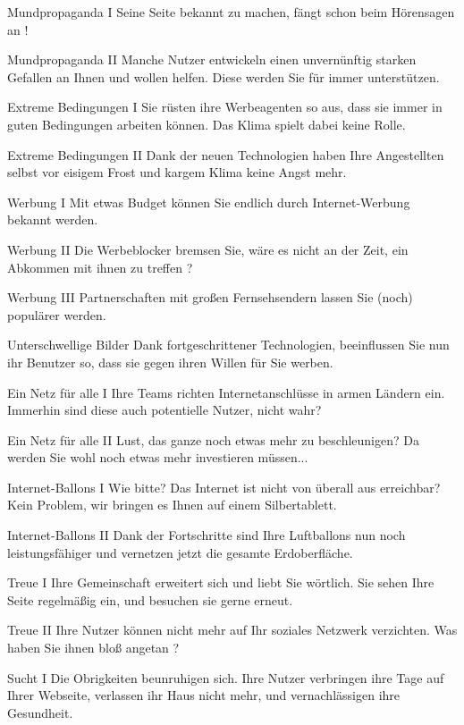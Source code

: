 Mundpropaganda I
Seine Seite bekannt zu machen, fängt schon beim Hörensagen an !

Mundpropaganda II
Manche Nutzer entwickeln einen unvernünftig starken Gefallen an Ihnen und wollen helfen. Diese werden Sie für immer unterstützen.



Extreme Bedingungen I
Sie rüsten ihre Werbeagenten so aus, dass sie immer in guten Bedingungen arbeiten können. Das Klima spielt dabei keine Rolle.


Extreme Bedingungen II
Dank der neuen Technologien haben Ihre Angestellten selbst vor eisigem Frost und kargem Klima keine Angst mehr.



Werbung I
Mit etwas Budget können Sie endlich durch Internet-Werbung bekannt werden.

Werbung II
Die Werbeblocker bremsen Sie, wäre es nicht an der Zeit, ein Abkommen mit ihnen zu treffen ?

Werbung III
Partnerschaften mit großen Fernsehsendern lassen Sie (noch) populärer werden.



Unterschwellige Bilder
Dank fortgeschrittener Technologien, beeinflussen Sie nun ihr Benutzer so, dass sie gegen ihren Willen für Sie werben.



Ein Netz für alle I
Ihre Teams richten Internetanschlüsse in armen Ländern ein. Immerhin sind diese auch potentielle Nutzer, nicht wahr?

Ein Netz für alle II
Lust, das ganze noch etwas mehr zu beschleunigen? Da werden Sie wohl noch etwas mehr investieren müssen...



Internet-Ballons I
Wie bitte? Das Internet ist nicht von überall aus erreichbar? Kein Problem, wir bringen es Ihnen auf einem Silbertablett.

Internet-Ballons II
Dank der Fortschritte sind Ihre Luftballons nun noch leistungsfähiger und vernetzen jetzt die gesamte Erdoberfläche.



Treue I
Ihre Gemeinschaft erweitert sich und liebt Sie wörtlich. Sie sehen Ihre Seite regelmäßig ein, und besuchen sie gerne erneut.

Treue II
Ihre Nutzer können nicht mehr auf Ihr soziales Netzwerk verzichten. Was haben Sie ihnen bloß angetan ?



Sucht I
Die Obrigkeiten beunruhigen sich. Ihre Nutzer verbringen ihre Tage auf Ihrer Webseite, verlassen ihr Haus nicht mehr, und vernachlässigen ihre Gesundheit.

